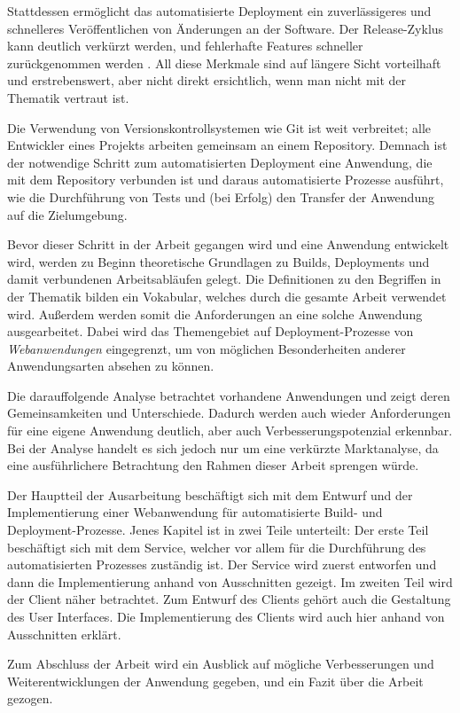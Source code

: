 Stattdessen ermöglicht das automatisierte Deployment ein zuverlässigeres und schnelleres Veröffentlichen von Änderungen an der Software. Der Release-Zyklus kann deutlich verkürzt werden, und fehlerhafte Features schneller zurückgenommen werden \citep[11f]{Humble2010}. All diese Merkmale sind auf längere Sicht vorteilhaft und erstrebenswert, aber nicht direkt ersichtlich, wenn man nicht mit der Thematik vertraut ist.

Die Verwendung von Versionskontrollsystemen wie Git ist weit verbreitet; alle Entwickler eines Projekts arbeiten gemeinsam an einem Repository. Demnach ist der notwendige Schritt zum automatisierten Deployment eine Anwendung, die mit dem Repository verbunden ist und daraus automatisierte Prozesse ausführt, wie die Durchführung von Tests und (bei Erfolg) den Transfer der Anwendung auf die Zielumgebung.

Bevor dieser Schritt in der Arbeit gegangen wird und eine Anwendung entwickelt wird, werden zu Beginn theoretische Grundlagen zu Builds, Deployments und damit verbundenen Arbeitsabläufen gelegt. Die Definitionen zu den Begriffen in der Thematik bilden ein Vokabular, welches durch die gesamte Arbeit verwendet wird. Außerdem werden somit die Anforderungen an eine solche Anwendung ausgearbeitet. Dabei wird das Themengebiet auf Deployment-Prozesse von \emph{Webanwendungen} eingegrenzt, um von möglichen Besonderheiten anderer Anwendungsarten absehen zu können.

Die darauffolgende Analyse betrachtet vorhandene Anwendungen und zeigt deren Gemeinsamkeiten und Unterschiede. Dadurch werden auch wieder Anforderungen für eine eigene Anwendung deutlich, aber auch Verbesserungspotenzial erkennbar. Bei der Analyse handelt es sich jedoch nur um eine verkürzte Marktanalyse, da eine ausführlichere Betrachtung den Rahmen dieser Arbeit sprengen würde.

Der Hauptteil der Ausarbeitung beschäftigt sich mit dem Entwurf und der Implementierung einer Webanwendung für automatisierte Build- und De\-ploy\-ment-Prozesse. Jenes Kapitel ist in zwei Teile unterteilt: Der erste Teil beschäftigt sich mit dem Service, welcher vor allem für die Durchführung des automatisierten Prozesses zuständig ist. Der Service wird zuerst entworfen und dann die Implementierung anhand von Ausschnitten gezeigt. Im zweiten Teil wird der Client näher betrachtet. Zum Entwurf des Clients gehört auch die Gestaltung des User Interfaces. Die Implementierung des Clients wird auch hier anhand von Ausschnitten erklärt.

Zum Abschluss der Arbeit wird ein Ausblick auf mögliche Verbesserungen und Weiterentwicklungen der Anwendung gegeben, und ein Fazit über die Arbeit gezogen.
